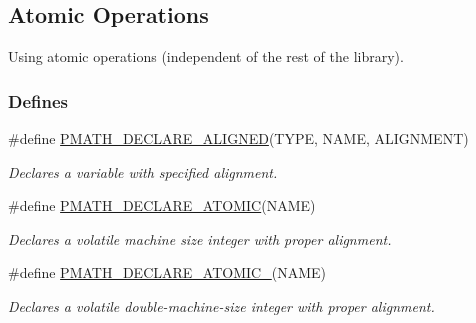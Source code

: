 \hypertarget{group__atomic__ops}{
\subsection{Atomic Operations}
\label{group__atomic__ops}
}
Using atomic operations (independent of the rest of the library).  


\subsubsection*{Defines}
\begin{CompactItemize}
\item 
\#define \hyperlink{group__atomic__ops_g7c8d6965c55b4461f4c93dbcd0e54e44}{PMATH\_\-DECLARE\_\-ALIGNED}(TYPE, NAME, ALIGNMENT)
\begin{CompactList}\small\item\em Declares a variable with specified alignment. \item\end{CompactList}\item 
\#define \hyperlink{group__atomic__ops_gea9d23f3c2f74768863e67ff2a8d17df}{PMATH\_\-DECLARE\_\-ATOMIC}(NAME)
\begin{CompactList}\small\item\em Declares a volatile machine size integer with proper alignment. \item\end{CompactList}\item 
\#define \hyperlink{group__atomic__ops_g2228cd9578858b0f60078fc87ef0774a}{PMATH\_\-DECLARE\_\-ATOMIC\_}(NAME)
\begin{CompactList}\small\item\em Declares a volatile double-machine-size integer with proper alignment. \item\end{CompactList}\end{CompactItemize}
